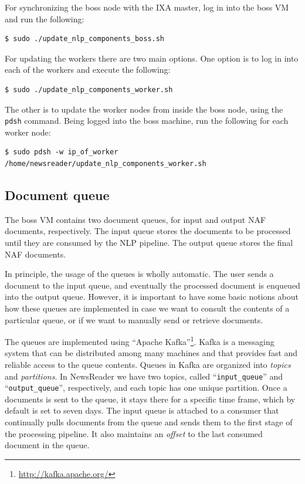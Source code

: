 \documentclass[a4]{article}
\begin{document}
For synchronizing the boss node with the IXA master, log in into the boss VM
and run the following:

\begin{verbatim}
$ sudo ./update_nlp_components_boss.sh
\end{verbatim}

For updating the workers there are two main options. One option is to log in
into each of the workers and execute the following:

\begin{verbatim}
$ sudo ./update_nlp_components_worker.sh
\end{verbatim}

The other is to update the worker nodes from inside the boss node, using the
\texttt{pdsh} command. Being logged into the boss machine, run the
following for each worker node:

\begin{verbatim}
$ sudo pdsh -w ip_of_worker /home/newsreader/update_nlp_components_worker.sh
\end{verbatim}

\subsection{Document queue}
\label{sec:document-queue}

The boss VM contains two document queues, for input and output NAF
documents, respectively. The input queue stores the documents to be
processed until they are consumed by the NLP pipeline. The output queue
stores the final NAF documents.

In principle, the usage of the queues is wholly automatic. The user sends a
document to the input queue, and eventually the processed document is
enqueued into the output queue. However, it is important to have some basic
notions about how these queues are implemented in case we want to consult
the contents of a particular queue, or if we want to manually send or
retrieve documents.

The queues are implemented using ``Apache
Kafka''\footnote{\url{http://kafka.apache.org/}}. Kafka is a messaging
system that can be distributed among many machines and that provides fast
and reliable access to the queue contents. Queues in Kafka are organized
into \emph{topics} and \emph{partitions}. In NewsReader we have two topics,
called ``\texttt{input\_queue}'' and ``\texttt{output\_queue}'',
respectively, and each topic has one unique partition. Once a documents is
sent to the queue, it stays there for a specific time frame, which by
default is set to seven days. The input queue is attached to a consumer that
continually pulls documents from the queue and sends them to the first stage
of the processing pipeline. It also maintains an \emph{offset} to the last
consumed document in the queue.
\end{document}
